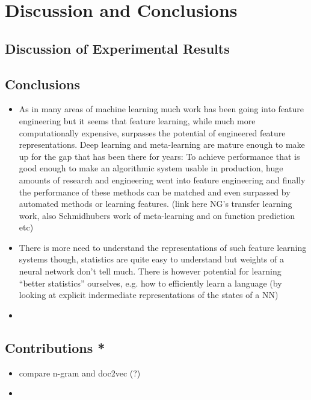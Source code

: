 
\clearpage
\section{Discussion and Conclusions}

\subsection{Discussion of Experimental Results}

\subsection{Conclusions}
\label{subs:conclusions}

\begin{itemize}
  \item As in many areas of machine learning much work has been going into feature engineering but it seems that feature learning, while much more computationally expensive, surpasses the potential of engineered feature representations. Deep learning and meta-learning are mature enough to make up for the gap that has been there for years: To achieve performance that is good enough to make an algorithmic system usable in production, huge amounts of research and engineering went into feature engineering and finally the performance of these methods can be matched and even surpassed by automated methods or learning features. (link here NG's transfer learning work, also Schmidhubers work of meta-learning and on function prediction etc)
  \item There is more need to understand the representations of such feature learning systems though, statistics are quite easy to understand but weights of a neural network don't tell much. There is however potential for learning ``better statistics'' ourselves, e.g. how to efficiently learn a language (by looking at explicit indermediate representations of the states of a NN)
  \item
\end{itemize}


\subsection{Contributions *}
\label{sub:contributions}

\begin{itemize}
  \item compare n-gram and doc2vec (?)
  \item
\end{itemize}

